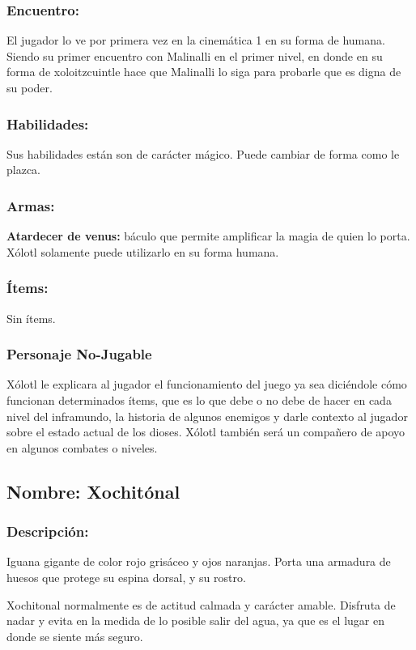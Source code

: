 \documentclass[11pt,letterpaper]{article}
\begin{document}
\subsubsection{Encuentro:}
El jugador lo ve por primera vez en la cinemática 1 en su forma de humana. Siendo su primer encuentro con Malinalli en el primer nivel, en donde en su forma de xoloitzcuintle hace que Malinalli lo siga para probarle que es digna de su poder. 

\subsubsection{Habilidades:}
Sus habilidades están son de carácter mágico. Puede cambiar de forma como le plazca.
\subsubsection{Armas:}
\textbf{Atardecer de venus:} báculo que permite amplificar la magia de quien lo porta. Xólotl solamente puede utilizarlo en su forma humana.
\subsubsection{Ítems:}
Sin ítems.

\subsubsection{Personaje No-Jugable}
Xólotl le explicara al jugador el funcionamiento del juego ya sea diciéndole cómo funcionan determinados ítems, que es lo que debe o no debe de hacer en cada nivel del inframundo, la historia de algunos enemigos y darle contexto al jugador sobre el estado actual de los dioses. Xólotl también será un compañero de apoyo en algunos combates o niveles.

\subsection{Nombre: Xochitónal}  

\subsubsection{Descripción:}
Iguana gigante de color rojo grisáceo y ojos naranjas. Porta una armadura de huesos que protege su espina dorsal, y su rostro.
\\
\par
Xochitonal normalmente es de actitud calmada y carácter amable. Disfruta de nadar y evita en la medida de lo posible salir del agua, ya que es el lugar en donde se siente más seguro.  
\end{document}
